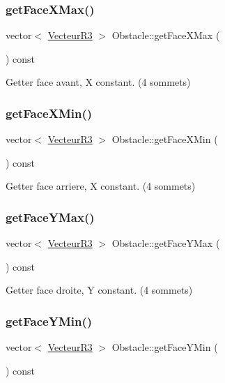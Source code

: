 \subsubsection{\texorpdfstring{get\+Face\+X\+Max()}{getFaceXMax()}}
{\footnotesize\ttfamily vector$<$ \mbox{\hyperlink{class_vecteur_r3}{Vecteur\+R3}} $>$ Obstacle\+::get\+Face\+X\+Max (\begin{DoxyParamCaption}{ }\end{DoxyParamCaption}) const}

Getter face avant, X constant. (4 sommets) \mbox{\label{class_obstacle_ab0e0bd5dac1a93875b521536b65b148c}} 
\subsubsection{\texorpdfstring{get\+Face\+X\+Min()}{getFaceXMin()}}
{\footnotesize\ttfamily vector$<$ \mbox{\hyperlink{class_vecteur_r3}{Vecteur\+R3}} $>$ Obstacle\+::get\+Face\+X\+Min (\begin{DoxyParamCaption}{ }\end{DoxyParamCaption}) const}

Getter face arriere, X constant. (4 sommets) \mbox{\label{class_obstacle_abc88684297b935308cd23f0155df9fe9}} 
\subsubsection{\texorpdfstring{get\+Face\+Y\+Max()}{getFaceYMax()}}
{\footnotesize\ttfamily vector$<$ \mbox{\hyperlink{class_vecteur_r3}{Vecteur\+R3}} $>$ Obstacle\+::get\+Face\+Y\+Max (\begin{DoxyParamCaption}{ }\end{DoxyParamCaption}) const}

Getter face droite, Y constant. (4 sommets) \mbox{\label{class_obstacle_ac3d65b0cf5addfb7058e93d9fd36f8d2}} 
\subsubsection{\texorpdfstring{get\+Face\+Y\+Min()}{getFaceYMin()}}
{\footnotesize\ttfamily vector$<$ \mbox{\hyperlink{class_vecteur_r3}{Vecteur\+R3}} $>$ Obstacle\+::get\+Face\+Y\+Min (\begin{DoxyParamCaption}{ }\end{DoxyParamCaption}) const}

